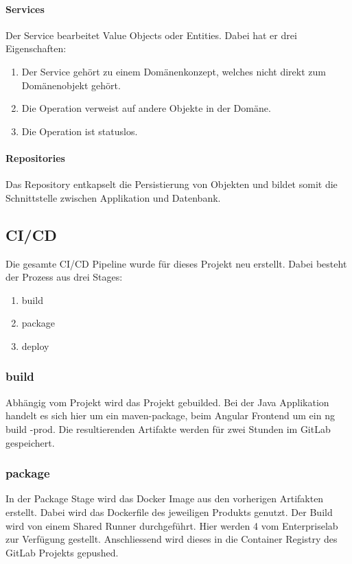\paragraph{Services}\label{services}
Der Service bearbeitet Value Objects oder Entities. Dabei hat er drei Eigenschaften: 
\begin{enumerate}
	\item Der Service gehört zu einem Domänenkonzept, welches nicht direkt zum Domänenobjekt gehört.
	\item Die Operation verweist auf andere Objekte in der Domäne.
	\item Die Operation ist statuslos. 
\end{enumerate}

\paragraph{Repositories}
Das Repository entkapselt die Persistierung von Objekten und bildet somit die Schnittstelle zwischen Applikation und Datenbank. 

\subsection{CI/CD}
Die gesamte \ac{CI/CD} Pipeline wurde für dieses Projekt neu erstellt. Dabei besteht der Prozess aus drei Stages: 
\begin{enumerate}
	\item build
	\item package
	\item deploy
\end{enumerate}

\subsubsection{build}
Abhängig vom Projekt wird das Projekt gebuilded. Bei der Java Applikation handelt es sich hier um ein maven-package, beim Angular Frontend um ein \glqq ng build -prod\grqq{}. Die resultierenden Artifakte werden für zwei Stunden im GitLab gespeichert. 
\subsubsection{package}
In der Package Stage wird das Docker Image aus den vorherigen Artifakten erstellt. Dabei wird das Dockerfile des jeweiligen Produkts genutzt. Der Build wird von einem Shared Runner durchgeführt. Hier werden 4 vom Enterpriselab zur Verfügung gestellt. Anschliessend wird dieses in die Container Registry des GitLab Projekts gepushed. 
